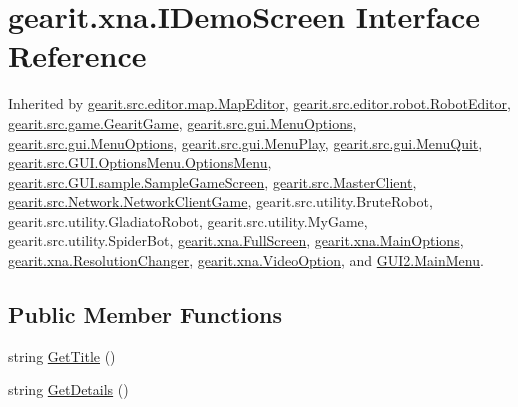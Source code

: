 \hypertarget{interfacegearit_1_1xna_1_1_i_demo_screen}{\section{gearit.\+xna.\+I\+Demo\+Screen Interface Reference}
\label{interfacegearit_1_1xna_1_1_i_demo_screen}
}


Inherited by \hyperlink{classgearit_1_1src_1_1editor_1_1map_1_1_map_editor}{gearit.\+src.\+editor.\+map.\+Map\+Editor}, \hyperlink{classgearit_1_1src_1_1editor_1_1robot_1_1_robot_editor}{gearit.\+src.\+editor.\+robot.\+Robot\+Editor}, \hyperlink{classgearit_1_1src_1_1game_1_1_gearit_game}{gearit.\+src.\+game.\+Gearit\+Game}, \hyperlink{classgearit_1_1src_1_1gui_1_1_menu_options}{gearit.\+src.\+gui.\+Menu\+Options}, \hyperlink{classgearit_1_1src_1_1gui_1_1_menu_options}{gearit.\+src.\+gui.\+Menu\+Options}, \hyperlink{classgearit_1_1src_1_1gui_1_1_menu_play}{gearit.\+src.\+gui.\+Menu\+Play}, \hyperlink{classgearit_1_1src_1_1gui_1_1_menu_quit}{gearit.\+src.\+gui.\+Menu\+Quit}, \hyperlink{classgearit_1_1src_1_1_g_u_i_1_1_options_menu_1_1_options_menu}{gearit.\+src.\+G\+U\+I.\+Options\+Menu.\+Options\+Menu}, \hyperlink{classgearit_1_1src_1_1_g_u_i_1_1sample_1_1_sample_game_screen}{gearit.\+src.\+G\+U\+I.\+sample.\+Sample\+Game\+Screen}, \hyperlink{classgearit_1_1src_1_1_master_client}{gearit.\+src.\+Master\+Client}, \hyperlink{classgearit_1_1src_1_1_network_1_1_network_client_game}{gearit.\+src.\+Network.\+Network\+Client\+Game}, gearit.\+src.\+utility.\+Brute\+Robot, gearit.\+src.\+utility.\+Gladiato\+Robot, gearit.\+src.\+utility.\+My\+Game, gearit.\+src.\+utility.\+Spider\+Bot, \hyperlink{classgearit_1_1xna_1_1_full_screen}{gearit.\+xna.\+Full\+Screen}, \hyperlink{classgearit_1_1xna_1_1_main_options}{gearit.\+xna.\+Main\+Options}, \hyperlink{classgearit_1_1xna_1_1_resolution_changer}{gearit.\+xna.\+Resolution\+Changer}, \hyperlink{classgearit_1_1xna_1_1_video_option}{gearit.\+xna.\+Video\+Option}, and \hyperlink{class_g_u_i2_1_1_main_menu}{G\+U\+I2.\+Main\+Menu}.

\subsection*{Public Member Functions}
\begin{DoxyCompactItemize}
\item 
string \hyperlink{interfacegearit_1_1xna_1_1_i_demo_screen_a4e3bc273ec13c0a0d673b3c5c8aef788}{Get\+Title} ()
\item 
string \hyperlink{interfacegearit_1_1xna_1_1_i_demo_screen_ab5a70d6cb4d68bd5f0be6865cca566fb}{Get\+Details} ()
\end{DoxyCompactItemize}


